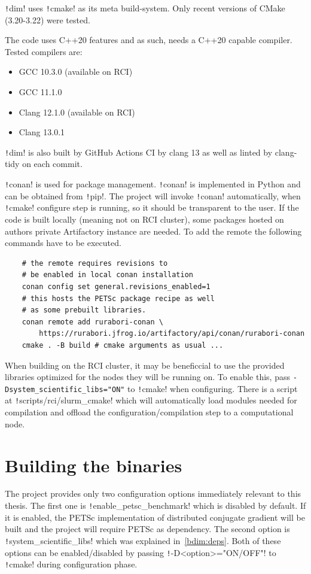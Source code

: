 \documentclass[thesis=M,english]{FITthesis}[2019/12/23]
\newcommand{\csre}[1]{\texttt!#1!}
\begin{document}
\csre{dim} uses \csre{cmake} as its meta build-system. Only recent versions of CMake (3.20-3.22) were tested.

The code uses C++20 features and as such, needs a C++20 capable compiler. Tested compilers
are:

\begin{itemize}
    \item GCC 10.3.0 (available on RCI)
    \item GCC 11.1.0
    \item Clang 12.1.0 (available on RCI)
    \item Clang 13.0.1
\end{itemize}
\csre{dim} is also built by GitHub Actions CI by clang 13 as well as linted by clang-tidy on each commit.

\csre{conan} is used for package management. \csre{conan} is implemented in Python and can be
obtained from \csre{pip}. The project will invoke \csre{conan} automatically, when \csre{cmake} configure step
is running, so it should be transparent to the user. If the code is built locally (meaning not on RCI cluster),
some packages hosted on authors private Artifactory instance are needed. To add the remote the following commands
have to be executed.

\begin{verbatim}
    # the remote requires revisions to 
    # be enabled in local conan installation
    conan config set general.revisions_enabled=1
    # this hosts the PETSc package recipe as well
    # as some prebuilt libraries.
    conan remote add rurabori-conan \
        https://rurabori.jfrog.io/artifactory/api/conan/rurabori-conan
    cmake . -B build # cmake arguments as usual ...
\end{verbatim}

When building on the RCI cluster, it may be beneficcial
to use the provided libraries optimized for the nodes they will be running on. To enable this,
pass \texttt{-Dsystem_scientific_libs="ON"} to \csre{cmake} when configuring. There is a script
at \csre{scripts/rci/slurm_cmake} which will automatically load modules needed for compilation and offload
the configuration/compilation step to a computational node.

\section{Building the binaries}

The project provides only two configuration options immediately relevant to this thesis. The
first one is \csre{enable_petsc_benchmark} which is disabled by default. If it is enabled,
the PETSc implementation of distributed conjugate gradient will be built and the project
will require PETSc as dependency. The second option is \csre{system_scientific_libs} which
was explained in~\ref{bdim:deps}. Both of these options can be enabled/disabled by passing
\csre{-D<option>="ON/OFF"} to \csre{cmake} during configuration phase.
\end{document}

